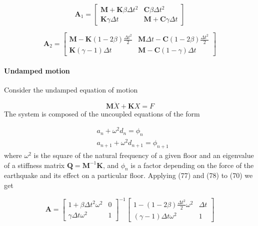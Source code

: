\documentclass{article}
\begin{document}
				\begin{equation}
					\textbf{A}_1 = \begin{bmatrix} \textbf{M}+ \textbf{K} \beta \Delta t^2 & \textbf{C} \beta \Delta t^2 \\
\textbf{K} \gamma \Delta t & \textbf{M} + \textbf{C}\gamma \Delta t\end{bmatrix} 
				\end{equation} \newline

				\begin{equation}
					\textbf{A}_2 = 
						\begin{bmatrix} 
						\textbf{M}- \textbf{K}(1 - 2\beta)\frac{\Delta t^2}{2} & \textbf{M} \Delta t -  \textbf{C}(1 - 2\beta)\frac{\Delta t^2}{2} \\
						\textbf{K}(\gamma - 1)\Delta t & \textbf{M} - \textbf{C}(1 - \gamma)\Delta t
						\end{bmatrix}
				\end{equation} \newline



				\paragraph{Undamped motion} Consider the undamped equation of motion

				\begin{equation}
					\textbf{M}\ddot{X}+\textbf{K}X =F
				\end{equation}
				The system is composed of the uncoupled equations of the form

				\begin{align}
				&a_n + \omega^2 d_n = \phi_n\\
				&a_{n+1} + \omega^2 d_{n+1} = \phi_{n+1}
				\end{align}
where $\omega^2$ is the square of the natural frequency of a given floor and an eigenvalue of a stiffness matrix $\textbf{Q} = \textbf{M}^{-1}\textbf{K}$, and $\phi_n$ is a factor depending on the force of the earthquake and its effect on a particular floor. Applying (77) and (78) to (70) we get

				\begin{equation}
					\textbf{A} = 
						\begin{bmatrix} 
						1+ \beta \Delta t^2 \omega^2 & 0 \\
						\gamma \Delta t \omega^2& 1\end{bmatrix}^{-1}\begin{bmatrix} 1 - (1 - 2\beta)\frac{\Delta t^2}{2}\omega^2 & \Delta t \\
					(\gamma - 1)\Delta t \omega^2 & 1
					\end{bmatrix}
				\end{equation}
\end{document}
